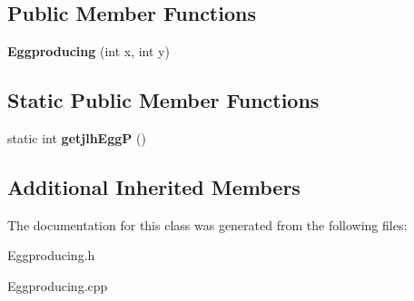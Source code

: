 \subsection*{Public Member Functions}
\begin{DoxyCompactItemize}
\item 
\mbox{\label{classEggproducing_a61b4dcb66766bd42d50b965c7e1e4b82}} 
{\bfseries Eggproducing} (int x, int y)
\end{DoxyCompactItemize}
\subsection*{Static Public Member Functions}
\begin{DoxyCompactItemize}
\item 
\mbox{\label{classEggproducing_a1372043ebaa06d28dc5df7ff361ccd66}} 
static int {\bfseries getjlh\+EggP} ()
\end{DoxyCompactItemize}
\subsection*{Additional Inherited Members}


The documentation for this class was generated from the following files\+:\begin{DoxyCompactItemize}
\item 
Eggproducing.\+h\item 
Eggproducing.\+cpp\end{DoxyCompactItemize}

